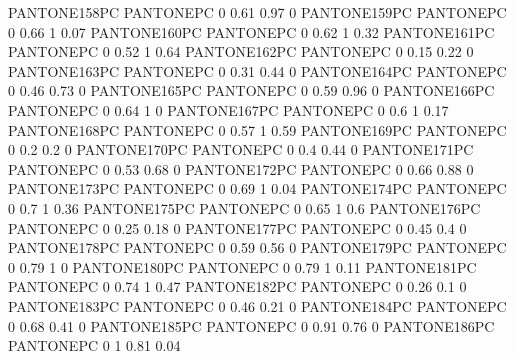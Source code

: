  {PANTONE158PC} {PANTONE\SpotSpace PC} {0 0.61 0.97 0}
 {PANTONE159PC} {PANTONE\SpotSpace PC} {0 0.66 1 0.07}
 {PANTONE160PC} {PANTONE\SpotSpace PC} {0 0.62 1 0.32}
 {PANTONE161PC} {PANTONE\SpotSpace PC} {0 0.52 1 0.64}
 {PANTONE162PC} {PANTONE\SpotSpace PC} {0 0.15 0.22 0}
 {PANTONE163PC} {PANTONE\SpotSpace PC} {0 0.31 0.44 0}
 {PANTONE164PC} {PANTONE\SpotSpace PC} {0 0.46 0.73 0}
 {PANTONE165PC} {PANTONE\SpotSpace PC} {0 0.59 0.96 0}
 {PANTONE166PC} {PANTONE\SpotSpace PC} {0 0.64 1 0}
 {PANTONE167PC} {PANTONE\SpotSpace PC} {0 0.6 1 0.17}
 {PANTONE168PC} {PANTONE\SpotSpace PC} {0 0.57 1 0.59}
 {PANTONE169PC} {PANTONE\SpotSpace PC} {0 0.2 0.2 0}
 {PANTONE170PC} {PANTONE\SpotSpace PC} {0 0.4 0.44 0}
 {PANTONE171PC} {PANTONE\SpotSpace PC} {0 0.53 0.68 0}
 {PANTONE172PC} {PANTONE\SpotSpace PC} {0 0.66 0.88 0}
 {PANTONE173PC} {PANTONE\SpotSpace PC} {0 0.69 1 0.04}
 {PANTONE174PC} {PANTONE\SpotSpace PC} {0 0.7 1 0.36}
 {PANTONE175PC} {PANTONE\SpotSpace PC} {0 0.65 1 0.6}
 {PANTONE176PC} {PANTONE\SpotSpace PC} {0 0.25 0.18 0}
 {PANTONE177PC} {PANTONE\SpotSpace PC} {0 0.45 0.4 0}
 {PANTONE178PC} {PANTONE\SpotSpace PC} {0 0.59 0.56 0}
 {PANTONE179PC} {PANTONE\SpotSpace PC} {0 0.79 1 0}
 {PANTONE180PC} {PANTONE\SpotSpace PC} {0 0.79 1 0.11}
 {PANTONE181PC} {PANTONE\SpotSpace PC} {0 0.74 1 0.47}
 {PANTONE182PC} {PANTONE\SpotSpace PC} {0 0.26 0.1 0}
 {PANTONE183PC} {PANTONE\SpotSpace PC} {0 0.46 0.21 0}
 {PANTONE184PC} {PANTONE\SpotSpace PC} {0 0.68 0.41 0}
 {PANTONE185PC} {PANTONE\SpotSpace PC} {0 0.91 0.76 0}
 {PANTONE186PC} {PANTONE\SpotSpace PC} {0 1 0.81 0.04}
